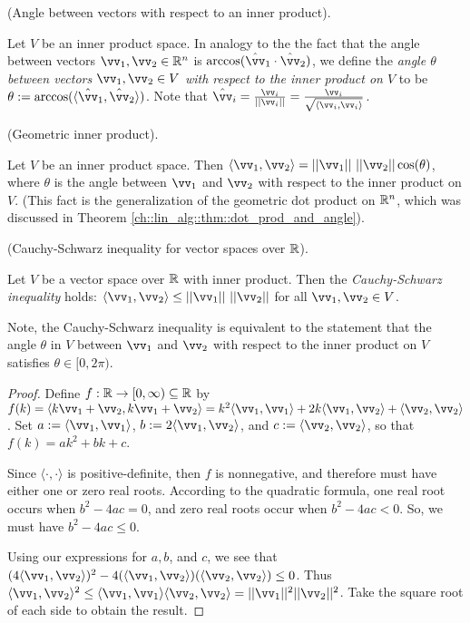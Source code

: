 \begin{defn}
    (Angle between vectors with respect to an inner product). 
    
    Let $V$ be an inner product space. In analogy to the the fact that the angle between vectors $\vv_1, \vv_2 \in \R^n$ is $\arccos(\hat{\vv}_1 \cdot \hat{\vv}_2)$, we define the \textit{angle $\theta$ between vectors $\vv_1, \vv_2 \in V$ with respect to the inner product on $V$} to be $\theta := \arccos(\langle \hat{\vv}_1, \hat{\vv}_2 \rangle)$. Note that $\hat{\vv}_i = \frac{\vv_i}{||\vv_i||} = \frac{\vv_i}{\sqrt{\langle \vv_i, \vv_i \rangle}}$.
\end{defn}

\begin{remark}
    (Geometric inner product).
    
    Let $V$ be an inner product space. Then $\langle \vv_1, \vv_2 \rangle = ||\vv_1||\spc||\vv_2|| \cos(\theta)$, where $\theta$ is the angle between $\vv_1$ and $\vv_2$ with respect to the inner product on $V$. (This fact is the generalization of the geometric dot product on $\mathbb{R}^n$, which was discussed in Theorem \ref{ch::lin_alg::thm::dot_prod_and_angle}).
\end{remark}

\begin{theorem}
\label{ch::bilinear_forms_metric_tensors::thm::Cauchy_Schwarz}
     (Cauchy-Schwarz inequality for vector spaces over $\mathbb{R}$).
     
     Let $V$ be a vector space over $\mathbb{R}$ with inner product. Then the \textit{Cauchy-Schwarz inequality} holds: $\langle \vv_1, \vv_2 \rangle \leq ||\vv_1|| \spc ||\vv_2||$ for all $\vv_1, \vv_2 \in V$. 
     
     Note, the Cauchy-Schwarz inequality is equivalent to the statement that the angle $\theta$ in $V$ between $\vv_1$ and $\vv_2$ with respect to the inner product on $V$ satisfies $\theta \in [0, 2 \pi)$.
\end{theorem}

\begin{proof}
    Define $f:\mathbb{R} \rightarrow [0, \infty) \subseteq \mathbb{R}$ by $f(k) = \langle k \vv_1 + \vv_2, k \vv_1 + \vv_2 \rangle = k^2 \langle \vv_1, \vv_1 \rangle + 2 k \langle \vv_1, \vv_2 \rangle + \langle \vv_2, \vv_2 \rangle$. Set $a := \langle \vv_1, \vv_1 \rangle$, $b := 2 \langle \vv_1, \vv_2 \rangle$, and $c := \langle \vv_2, \vv_2 \rangle$, so that $f(k) = ak^2 + bk + c$.
    
    Since $\langle \cdot, \cdot \rangle$ is positive-definite, then $f$ is nonnegative, and therefore must have either one or zero real roots. According to the quadratic formula, one real root occurs when $b^2 - 4ac = 0$, and zero real roots occur when $b^2 - 4ac < 0$. So, we must have $b^2 - 4ac \leq 0$. 
    
    Using our expressions for $a, b$, and $c$, we see that $(4 \langle \vv_1, \vv_2 \rangle)^2 - 4(\langle \vv_1, \vv_2 \rangle)(\langle \vv_2, \vv_2 \rangle) \leq 0$. Thus \\ ${\langle \vv_1, \vv_2 \rangle^2 \leq \langle \vv_1, \vv_1 \rangle \langle \vv_2, \vv_2 \rangle = ||\vv_1||^2 ||\vv_2||^2}$. Take the square root of each side to obtain the result.  
\end{proof}

